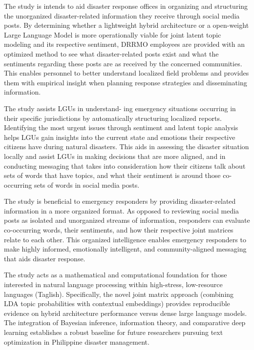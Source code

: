 \begin{description}[style=sameline,leftmargin=0pt]
	\item[Bulacan and CAMANAVA Disaster Response Offices.] The study is
	intends to aid disaster response offices in organizing and structuring the
	unorganized disaster-related information they receive through social media
	posts. By determining whether a lightweight hybrid architecture or a
	open-weight Large Language Model is more operationally viable for joint latent
	topic modeling and its respective sentiment, DRRMO employees are provided
	with an optimized method to see what disaster-related posts exist and what
	the sentiments regarding these posts are as received by the concerned
	communities. This enables personnel to better understand localized field
	problems and provides them with empirical insight when planning response
	strategies and disseminating information.
	
	\item[Local Government Units (LGUs).] The study assists LGUs in understand-
	ing emergency situations occurring in their specific jurisdictions by
	automatically structuring localized reports. Identifying the most urgent
	issues through sentiment and latent topic analysis helps LGUs gain
	insights into the current state and emotions their respective citizens have
	during natural disasters. This aids in assessing the disaster situation
	locally and assist LGUs in making decisions that are more aligned, and in
	conducting messaging that takes into consideration how their citizens talk
	about sets of words that have topics, and what their sentiment is
	around those co-occurring sets of words in social media posts.
	
	\item[Emergency Responders.] The study is beneficial to emergency
	responders by providing disaster-related information in a more organized
	format. As opposed to reviewing social media posts as isolated and
	unorganized streams of information, responders can evaluate co-occurring
	words, their sentiments, and how their respective joint matrices relate to
	each other. This organized intelligence enables emergency responders to make
	highly informed, emotionally intelligent, and community-aligned messaging
	that aids disaster response.
	
	\item[Researchers and Future Developers.] The study acts as a mathematical
	and computational foundation for those interested in natural language
	processing within high-stress, low-resource languages (Taglish).
	Specifically, the novel joint matrix approach (combining LDA topic
	probabilities with \xlmr{} contextual embeddings) provides reproducible
	evidence on hybrid architecture performance versus dense large language
	models. The integration of Bayesian inference, information theory, and
	comparative deep learning establishes a robust baseline for future researchers
	pursuing text optimization in Philippine disaster management.
\end{description}

